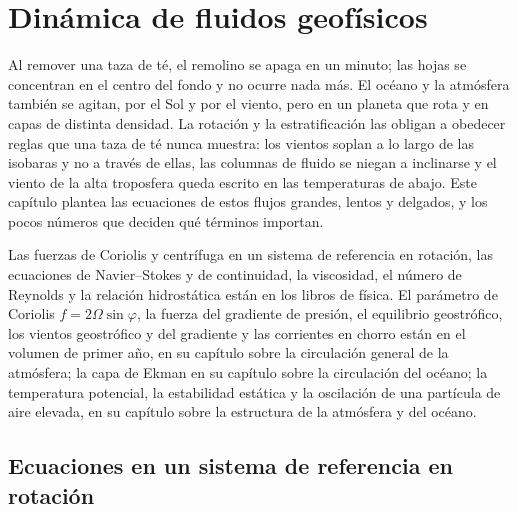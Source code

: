 \chapter{Dinámica de fluidos geofísicos}\label{ch:b3:gfd-foundations}

Al remover una taza de té, el remolino se apaga en un minuto; las hojas se
concentran en el centro del fondo y no ocurre nada más. El océano y la
atmósfera también se agitan, por el Sol y por el viento, pero en un planeta
que rota y en capas de distinta densidad. La rotación y la estratificación
las obligan a obedecer reglas que una taza de té nunca muestra: los vientos
soplan a lo largo de las isobaras y no a través de ellas, las columnas de
fluido se niegan a inclinarse y el viento de la alta troposfera queda
escrito en las temperaturas de abajo. Este capítulo plantea las ecuaciones
de estos flujos grandes, lentos y delgados, y los pocos números que deciden qué términos importan.

\begin{recall}
Las fuerzas de Coriolis y centrífuga en un sistema de referencia en rotación, las ecuaciones de Navier--Stokes
y de continuidad, la viscosidad, el número de Reynolds y la relación hidrostática
están en los libros de física. El parámetro de Coriolis $f = 2\Omega
\sin\varphi$, la fuerza del gradiente de presión, el equilibrio geostrófico, los
vientos geostrófico y del gradiente y las corrientes en chorro están en el
volumen de primer año, en su capítulo sobre la circulación general de la atmósfera; la
capa de Ekman en su capítulo sobre la circulación del océano; la temperatura
potencial, la estabilidad estática y la oscilación de una partícula de aire
elevada, en su capítulo sobre la estructura de la atmósfera y del océano.
\end{recall}

\section{Ecuaciones en un sistema de referencia en rotación}\label{sec:b3:gfd-foundations:equations}

